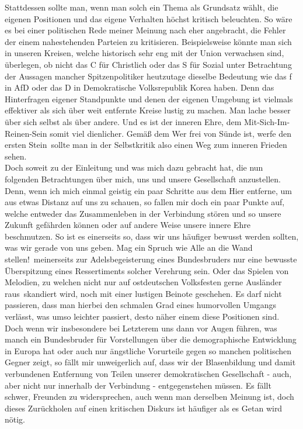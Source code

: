\begin{multicols}{2}
Stattdessen sollte man, wenn man solch ein Thema als Grundsatz wählt, die eigenen Positionen und das eigene Verhalten höchst kritisch beleuchten. So wäre es bei einer politischen Rede meiner Meinung nach eher angebracht, die Fehler der einem nahestehenden Parteien zu kritisieren. Beispielsweise könnte man sich in unseren Kreisen, welche historisch sehr eng mit der Union verwachsen sind, überlegen, ob nicht das C für Christlich oder das S für Sozial unter Betrachtung der Aussagen mancher Spitzenpolitiker heutzutage dieselbe Bedeutung wie das f in AfD oder das D in Demokratische Volksrepublik Korea haben. Denn das Hinterfragen eigener Standpunkte und denen der eigenen Umgebung ist vielmals effektiver als sich über weit entfernte Kreise lustig zu machen. Man lache besser über sich selbst als über andere. Und es ist der inneren Ehre, dem Mit-Sich-Im-Reinen-Sein somit viel dienlicher. Gemäß dem \glqq Wer frei von Sünde ist, werfe den ersten Stein\grqq ~sollte man in der Selbstkritik also einen Weg zum inneren Frieden sehen.
\\
Doch soweit zu der Einleitung und was mich dazu gebracht hat, die nun folgenden Betrachtungen über mich, uns und unsere Gesellschaft anzustellen.
\\
Denn, wenn ich mich einmal geistig ein paar Schritte aus dem Hier entferne, um aus etwas Distanz auf uns zu schauen, so fallen mir doch ein paar Punkte auf, welche entweder das Zusammenleben in der Verbindung stören und so unsere Zukunft gefährden können oder auf andere Weise unsere innere Ehre beschmutzen. So ist es einerseits so, dass wir uns häufiger bewusst werden sollten, was wir gerade von uns geben. Mag ein Spruch wie \glqq Alle an die Wand stellen!\grqq ~meinerseits zur Adelsbegeisterung eines Bundesbruders nur eine bewusste Überspitzung eines Ressertiments solcher Verehrung sein. Oder das Spielen von Melodien, zu welchen nicht nur auf ostdeutschen Volksfesten gerne \glqq Ausländer raus\grqq ~skandiert wird, noch mit einer lustigen Beinote geschehen. Es darf nicht passieren, dass man hierbei den schmalen Grad eines humorvollen Umgangs verlässt, was umso leichter passiert, desto näher einem diese Positionen sind. Doch wenn wir insbesondere bei Letzterem uns dann vor Augen führen, was manch ein Bundesbruder für Vorstellungen über die demographische Entwicklung in Europa hat oder auch nur ängstliche Vorurteile gegen so manchen politischen Gegner zeigt, so fällt mir unweigerlich auf, dass wir der Blasenbildung und damit verbundenen Entfernung von Teilen unserer demokratischen Gesellschaft - auch, aber nicht nur innerhalb der Verbindung - entgegenstehen müssen. Es fällt schwer, Freunden zu widersprechen, auch wenn man derselben Meinung ist, doch dieses Zurückholen auf einen kritischen Diskurs ist häufiger als es Getan wird nötig.

\end{multicols}
